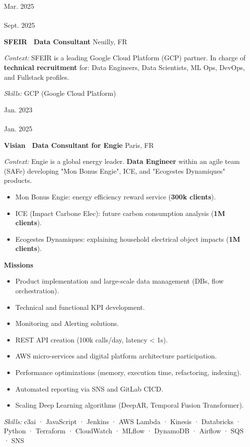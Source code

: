 \documentclass[10pt, a4paper]{article}
\newcommand{\firstcolwidth}{65pt}
\newcommand{\spaceaftersection}{0.8em}
\newcommand{\newsectionspace}{
    \begin{minipage}[t]{\linegoal}
        \hfill
        \vspace{\spaceaftersection}
    \end{minipage}
}
\newcommand{\experience}[6]{
    \begin{minipage}[t]{\firstcolwidth}
        \footnotesize{#1 \\ \textemdash \\ #2}
    \end{minipage}
    \begin{minipage}[t]{\linegoal}
        \textbf{\normalsize{#3 \textemdash\ #4}}
        \hfill
        \footnotesize{#5}
        \begin{singlespace}
            \begin{flushleft}
                \footnotesize{#6}
            \end{flushleft}
        \end{singlespace}
    \end{minipage}
}
\begin{document}
    \newsectionspace
    \experience{Mar. 2025}{Sept. 2025}{SFEIR}{Data Consultant}{Neuilly, FR}{
        \textit{Context:} SFEIR is a leading Google Cloud Platform (GCP) partner. 
        In charge of \textbf{technical recruitment} for: Data Engineers, Data Scientists, ML Ops, DevOps, and Fullstack profiles.
        
        \textit{Skills:} GCP (Google Cloud Platform)
    }

    \newsectionspace
    \experience{Jan. 2023}{Jan. 2025}{Visian}{Data Consultant for Engie}{Paris, FR}{
        \textit{Context:} Engie is a global energy leader. \textbf{Data Engineer} within an agile team (SAFe) developing "Mon Bonus Engie", ICE, and "Ecogestes Dynamiques" products.
        \begin{itemize}[nosep, leftmargin=*]
            \item Mon Bonus Engie: energy efficiency reward service (\textbf{300k clients}).
            \item ICE (Impact Carbone Elec): future carbon consumption analysis (\textbf{1M clients}).
            \item Ecogestes Dynamiques: explaining household electrical object impacts (\textbf{1M clients}).
        \end{itemize}

        \textbf{Missions}
        \begin{itemize}[nosep, leftmargin=*]
            \item Product implementation and large-scale data management (DBs, flow orchestration).
            \item Technical and functional KPI development.
            \item Monitoring and Alerting solutions.
            \item REST API creation (100k calls/day, latency < 1s).
            \item AWS micro-services and digital platform architecture participation.
            \item Performance optimizations (memory, execution time, refactoring, indexing).
            \item Automated reporting via SNS and GitLab CICD.
            \item Scaling Deep Learning algorithms (DeepAR, Temporal Fusion Transformer). 
        \end{itemize}

        \textit{Skills:} c3ai · JavaScript · Jenkins · AWS Lambda · Kinesis · Databricks · Python · Terraform · CloudWatch · MLflow · DynamoDB · Airflow · SQS · SNS
    }
        
\end{document}
